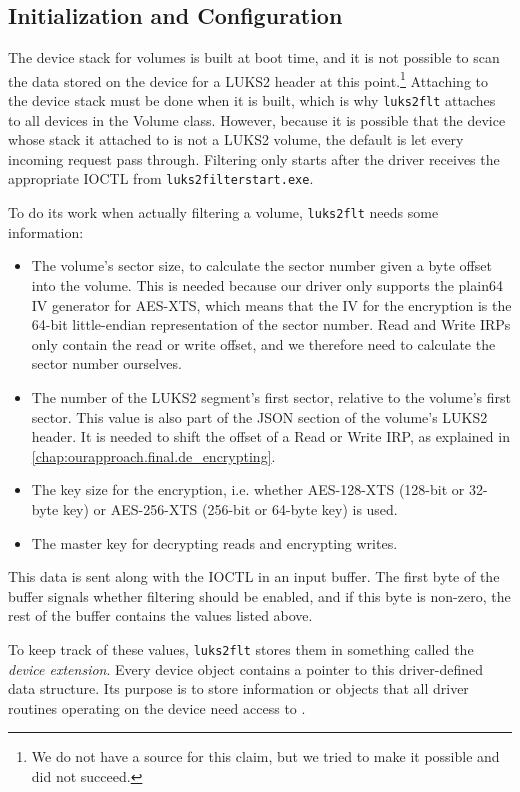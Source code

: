\subsection{Initialization and Configuration}
\label{chap:ourapproach.final.init}
The device stack for volumes is built at boot time, and it is not possible to scan the data stored on the device for a LUKS2 header at this point.\footnote{\label{fn:ourapproach.final.readatboot} We do not have a source for this claim, but we tried to make it possible and did not succeed.} Attaching to the device stack must be done when it is built, which is why \texttt{luks2flt} attaches to all devices in the Volume class. However, because it is possible that the device whose stack it attached to is not a LUKS2 volume, the default is let every incoming request pass through. Filtering only starts after the driver receives the appropriate IOCTL from \texttt{luks2filterstart.exe}.

To do its work when actually filtering a volume, \texttt{luks2flt} needs some information:
\begin{itemize}
	\item The volume's sector size, to calculate the sector number given a byte offset into the volume. This is needed because our driver only supports the plain64 IV generator for AES-XTS, which means that the IV for the encryption is the 64-bit little-endian representation of the sector number. Read and Write IRPs only contain the read or write offset, and we therefore need to calculate the sector number ourselves.
	\item The number of the LUKS2 segment's first sector, relative to the volume's first sector. This value is also part of the JSON section of the volume's LUKS2 header. It is needed to shift the offset of a Read or Write IRP, as explained in \autoref{chap:ourapproach.final.de_encrypting}.
	\item The key size for the encryption, i.e. whether AES-128-XTS (128-bit or 32-byte key) or AES-256-XTS (256-bit or 64-byte key) is used.
	\item The master key for decrypting reads and encrypting writes.
\end{itemize}
This data is sent along with the IOCTL in an input buffer. The first byte of the buffer signals whether filtering should be enabled, and if this byte is non-zero, the rest of the buffer contains the values listed above.

To keep track of these values, \texttt{luks2flt} stores them in something called the \emph{device extension}. Every device object contains a pointer to this driver-defined data structure. Its purpose is to store information or objects that all driver routines operating on the device need access to \cite{Kerneldriver}.

